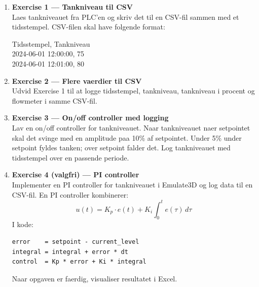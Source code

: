 \documentclass[12pt, a4paper]{article}
\begin{document}
\begin{tcolorbox}[tipbox, title={\faTasks\quad Øvelsesopgaver}]
\begin{enumerate}[leftmargin=1.5em, itemsep=8pt]

  \item \textbf{Exercise 1 --- Tankniveau til CSV}\\
    Laes tankniveauet fra PLC'en og skriv det til en CSV-fil sammen med
    et tidsstempel. CSV-filen skal have folgende format:
    \begin{center}
    \ttfamily\small
    Tidsstempel, Tankniveau\\
    2024-06-01 12:00:00, 75\\
    2024-06-01 12:01:00, 80
    \end{center}

  \item \textbf{Exercise 2 --- Flere vaerdier til CSV}\\
    Udvid Exercise 1 til at logge tidsstempel, tankniveau, tankniveau i
    procent og flowmeter i samme CSV-fil.

  \item \textbf{Exercise 3 --- On/off controller med logging}\\
    Lav en on/off controller for tankniveauet. Naar tankniveauet naer
    setpointet skal det svinge med en amplitude paa 10\% af setpointet.
    Under 5\% under setpoint fyldes tanken; over setpoint falder det.
    Log tankniveauet med tidsstempel over en passende periode.

  \item \textbf{Exercise 4 (valgfri) --- PI controller}\\
    Implementer en PI controller for tankniveauet i Emulate3D og log
    data til en CSV-fil. En PI controller kombinerer:
    \[
      u(t) = K_p \cdot e(t) + K_i \int_0^t e(\tau)\,d\tau
    \]
    I kode:
    \begin{center}
    \begin{minipage}{0.75\linewidth}
    \begin{tcolorbox}[pythonbox, title={\faPython\quad PI controller (skelet)}]
\begin{verbatim}
error    = setpoint - current_level
integral = integral + error * dt
control  = Kp * error + Ki * integral
\end{verbatim}
    \end{tcolorbox}
    \end{minipage}
    \end{center}
    Naar opgaven er faerdig, visualiser resultatet i Excel.

\end{enumerate}
\end{tcolorbox}
\end{document}
